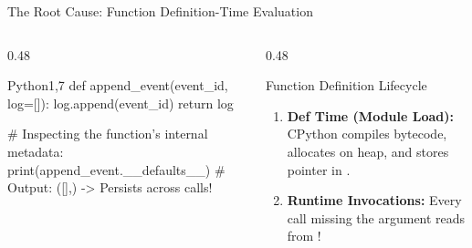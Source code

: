 \begin{frame}[fragile]{The Root Cause: Function Definition-Time Evaluation}
  \begin{columns}[T,onlytextwidth]
    \begin{column}{0.48\textwidth}
      \begin{HighlightedCodeBlock}{Python}{1,7}
def append_event(event_id, log=[]):
    log.append(event_id)
    return log

# Inspecting the function's internal metadata:
print(append_event.__defaults__)
# Output: ([],) -> Persists across calls!
      \end{HighlightedCodeBlock}
    \end{column}
    \begin{column}{0.48\textwidth}
      \begin{ConceptBox}{Function Definition Lifecycle}
        \scriptsize
        \begin{enumerate}\setlength{\itemsep}{0.06cm}
          \item \textbf{Def Time (Module Load):} CPython compiles bytecode, allocates \InlineCode{[]} on heap, and stores pointer in .
          \item \textbf{Runtime Invocations:} Every call missing the argument reads from !
        \end{enumerate}
      \end{ConceptBox}
    \end{column}
  \end{columns}
  \vspace{0.08cm}
\end{frame}

